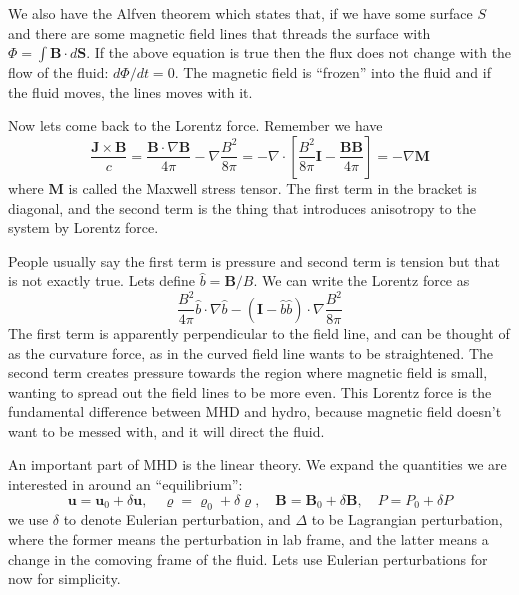 \documentclass[letterpaper, 11pt]{article}
\numberwithin{equation}{section}
\numberwithin{figure}{section}
\begin{document}
We also have the Alfven theorem which states that, if we have some surface $S$
and there are some magnetic field lines that threads the surface with $\Phi =
\int \mathbf{B}\cdot d\mathbf{S}$. If the above equation is true then the flux
does not change with the flow of the fluid: $d\Phi/dt = 0$. The magnetic field
is ``frozen'' into the fluid and if the fluid moves, the lines moves with it.

Now lets come back to the Lorentz force. Remember we have
\begin{equation}
  \label{eq:10}
  \frac{\mathbf{J}\times \mathbf{B}}{c} = \frac{\mathbf{B}\cdot \nabla \mathbf{B}}{4\pi} - \nabla \frac{B^2}{8\pi} = -\nabla\cdot \left[ \frac{B^2}{8\pi}\mathbf{I} - \frac{\mathbf{B} \mathbf{B}}{4\pi} \right] = -\nabla \mathbf{M}
\end{equation}
where $\mathbf{M}$ is called the Maxwell stress tensor. The first term in the
bracket is diagonal, and the second term is the thing that introduces anisotropy
to the system by Lorentz force.

People usually say the first term is pressure and second term is tension but
that is not exactly true. Lets define $\hat{b} = \mathbf{B}/B$. We can write
the Lorentz force as
\begin{equation}
  \label{eq:11}
  \frac{B^2}{4\pi} \hat{b}\cdot\nabla \hat{b} - (\mathbf{I} - \hat{b} \hat{b})\cdot \nabla \frac{B^2}{8\pi}
\end{equation}
The first term is apparently perpendicular to the field line, and can be thought
of as the curvature force, as in the curved field line wants to be straightened.
The second term creates pressure towards the region where magnetic field is
small, wanting to spread out the field lines to be more even. This Lorentz force
is the fundamental difference between MHD and hydro, because magnetic field
doesn't want to be messed with, and it will direct the fluid.

An important part of MHD is the linear theory. We expand the quantities we are
interested in around an ``equilibrium'':
\begin{equation}
  \label{eq:12}
  \mathbf{u} = \mathbf{u}_0 + \delta \mathbf{u},\quad \varrho = \varrho_0 + \delta\varrho,\quad
  \mathbf{B} = \mathbf{B}_0 + \delta \mathbf{B},\quad P = P_0 + \delta P
\end{equation}
we use $\delta$ to denote Eulerian perturbation, and $\Delta$ to be Lagrangian
perturbation, where the former means the perturbation in lab frame, and the
latter means a change in the comoving frame of the fluid. Lets use Eulerian
perturbations for now for simplicity.
\end{document}

